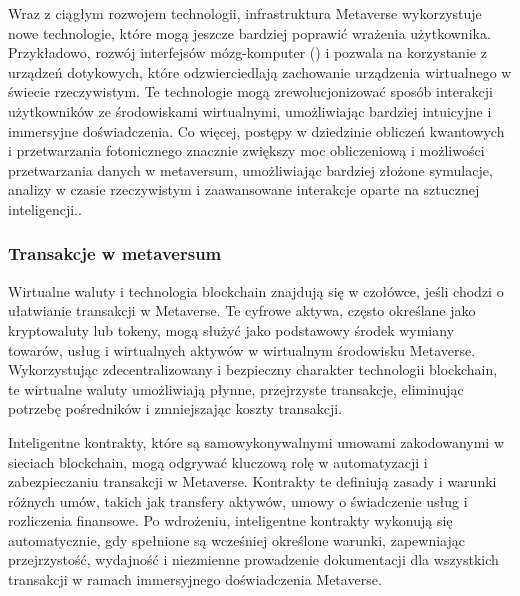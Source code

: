 Wraz z ciągłym rozwojem technologii, infrastruktura Metaverse wykorzystuje nowe technologie, które mogą jeszcze bardziej poprawić wrażenia użytkownika. Przykładowo, rozwój interfejsów mózg-komputer  () i pozwala na korzystanie z urządzeń dotykowych, które odzwierciedlają zachowanie urządzenia wirtualnego w świecie rzeczywistym. Te technologie mogą zrewolucjonizować sposób interakcji użytkowników ze środowiskami wirtualnymi, umożliwiając bardziej intuicyjne i immersyjne doświadczenia. Co więcej, postępy w dziedzinie obliczeń kwantowych i przetwarzania fotonicznego znacznie zwiększy moc obliczeniową i możliwości przetwarzania danych w metaversum, umożliwiając bardziej złożone symulacje, analizy w czasie rzeczywistym i zaawansowane interakcje oparte na sztucznej inteligencji.\cite{metaverseInfrastructureIEEE}.

\subsubsection{Transakcje w metaversum}

Wirtualne waluty i technologia blockchain znajdują się w czołówce, jeśli chodzi o ułatwianie transakcji w Metaverse. Te cyfrowe aktywa, często określane jako kryptowaluty lub tokeny, mogą służyć jako podstawowy środek wymiany towarów, usług i wirtualnych aktywów w wirtualnym środowisku Metaverse. Wykorzystując zdecentralizowany i bezpieczny charakter technologii blockchain, te wirtualne waluty umożliwiają płynne, przejrzyste transakcje, eliminując potrzebę pośredników i zmniejszając koszty transakcji\cite{metaverseInfrastructureIEEE}.

Inteligentne kontrakty, które są samowykonywalnymi umowami zakodowanymi w sieciach blockchain, mogą odgrywać kluczową rolę w automatyzacji i zabezpieczaniu transakcji w Metaverse. Kontrakty te definiują zasady i warunki różnych umów, takich jak transfery aktywów, umowy o świadczenie usług i rozliczenia finansowe. Po wdrożeniu, inteligentne kontrakty wykonują się automatycznie, gdy spełnione są wcześniej określone warunki, zapewniając przejrzystość, wydajność i niezmienne prowadzenie dokumentacji dla wszystkich transakcji w ramach immersyjnego doświadczenia Metaverse\cite{metaverseInfrastructureIEEE}.

